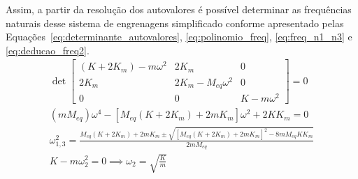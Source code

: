 Assim, a partir da resolução dos autovalores é possível determinar as frequências naturais desse sistema de engrenagens simplificado conforme apresentado pelas Equações~\ref{eq:determinante_autovalores}, \ref{eq:polinomio_freq}, \ref{eq:freq_n1_n3} e \ref{eq:deducao_freq2}.
\begin{gather}
	\det \begin{bmatrix} 
		(K+2K_m) - m\omega^2 & 2K_m & 0 \\ 
		2K_m & 2K_m - M_{eq}\omega^2 & 0 \\ 
		0 & 0 & K - m\omega^2 
	\end{bmatrix} = 0
	\label{eq:determinante_autovalores}
\\[1em]
	(m M_{eq}) \omega^4 - \left[ M_{eq}(K + 2K_m) + 2mK_m \right] \omega^2 + 2K K_m = 0
	\label{eq:polinomio_freq}
\\[1em]
	\omega_{1,3}^2 = \frac{M_{eq}(K + 2K_m) + 2mK_m \pm \sqrt{\left[ M_{eq}(K + 2K_m) + 2mK_m \right]^2 - 8 m M_{eq} K K_m}}{2 m M_{eq}}
	\label{eq:freq_n1_n3}
\\[1em]
	K - m\omega_2^2  = 0 \implies 
	\omega_2 = \sqrt{\frac{K}{m}}
	\label{eq:deducao_freq2}
\end{gather}
